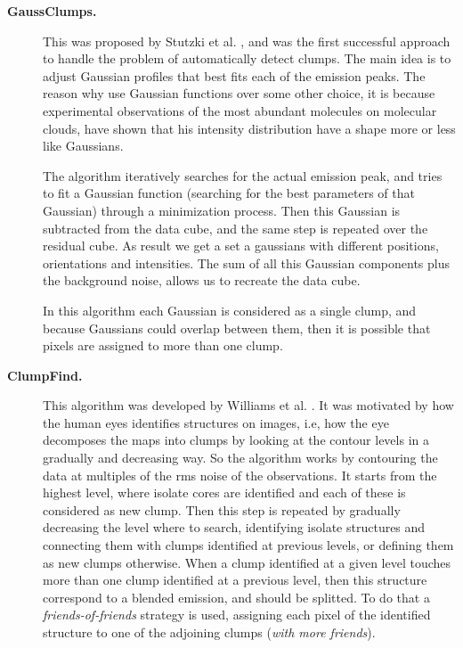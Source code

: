 \documentclass[letter, 11pt]{article}
\begin{document}
\begin{description}
    \item[\textbf{GaussClumps.}] This was proposed by Stutzki et al. \cite{Stutzki}, and was the first successful approach to handle the problem of automatically detect clumps. The main idea is to adjust Gaussian profiles that best fits each of the emission peaks. The reason why use Gaussian functions over some other choice, it is because experimental observations of the most abundant molecules on molecular clouds, have shown that his intensity distribution have a shape more or less like Gaussians.  

    The algorithm iteratively searches for the actual emission peak, and tries to fit a Gaussian function (searching for the best parameters of that Gaussian) through a minimization process. Then this Gaussian is subtracted from the data cube, and the same step is repeated over the residual cube. As result we get a set a gaussians with different positions, orientations and intensities. The sum of all this Gaussian components plus the background noise, allows us to recreate the data cube.

    In this algorithm each Gaussian is considered as a single clump, and because Gaussians could overlap between them, then it is possible that pixels are assigned to more than one clump.


    \item[\textbf{ClumpFind.}] This algorithm was developed by Williams et al. \cite{Williams}.  It was motivated by how the human eyes identifies structures on images, i.e, how the eye decomposes the maps into clumps by looking at the contour levels in a gradually and decreasing way. So the algorithm works by contouring the data at multiples of the rms noise of the observations. It starts from the highest level, where isolate cores are identified and each of these is considered as new clump. Then this step is repeated by gradually decreasing the level where to search,  identifying isolate structures and connecting them with clumps identified at previous levels, or defining them as new clumps otherwise. When a clump identified at a given level touches more than one clump identified at a previous level, then this structure correspond to a blended emission, and should be splitted. To do that a \textit{friends-of-friends} strategy is used, assigning each pixel of the identified structure to one of the adjoining clumps (\textit{with more friends}).


\end{description}
\end{document}

